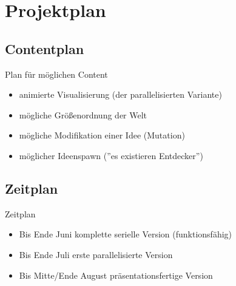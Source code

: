 \section{Projektplan}
\subsection{Contentplan}
\begin{frame}{Plan für möglichen Content}
	\begin{itemize}
		\item animierte Visualisierung (der parallelisierten Variante)
		\item mögliche Größenordnung der Welt
		\item mögliche Modifikation einer Idee (Mutation)
		\item möglicher Ideenspawn (''es existieren Entdecker'')
	\end{itemize}
\end{frame}

\subsection{Zeitplan}
\begin{frame}{Zeitplan}
	\begin{itemize}
		\item Bis Ende Juni komplette serielle Version (funktionsfähig)
		\item Bis Ende Juli erste parallelisierte Version
		\item Bis Mitte/Ende August präsentationsfertige Version
	\end{itemize}
\end{frame}
